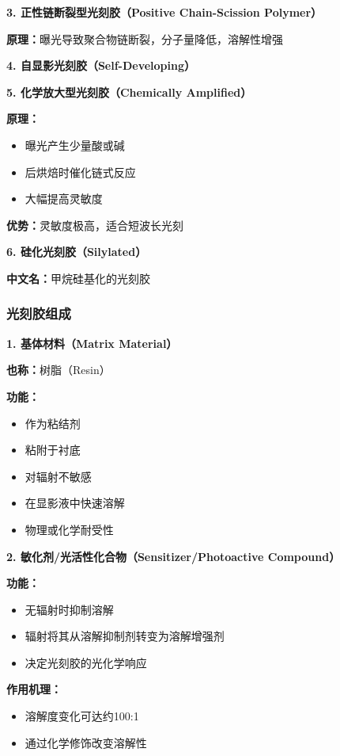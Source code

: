 \documentclass[UTF8,12pt,a4paper]{ctexart}
\begin{document}
\textbf{3. 正性链断裂型光刻胶（Positive Chain-Scission Polymer）}

\textbf{原理：}曝光导致聚合物链断裂，分子量降低，溶解性增强

\textbf{4. 自显影光刻胶（Self-Developing）}

\textbf{5. 化学放大型光刻胶（Chemically Amplified）}

\textbf{原理：}
\begin{itemize}
    \item 曝光产生少量酸或碱
    \item 后烘焙时催化链式反应
    \item 大幅提高灵敏度
\end{itemize}

\textbf{优势：}灵敏度极高，适合短波长光刻

\textbf{6. 硅化光刻胶（Silylated）}

\textbf{中文名：}甲烷硅基化的光刻胶

\subsubsection{光刻胶组成}

\textbf{1. 基体材料（Matrix Material）}

\textbf{也称：}树脂（Resin）

\textbf{功能：}
\begin{itemize}
    \item 作为粘结剂
    \item 粘附于衬底
    \item 对辐射不敏感
    \item 在显影液中快速溶解
    \item 物理或化学耐受性
\end{itemize}

\textbf{2. 敏化剂/光活性化合物（Sensitizer/Photoactive Compound）}

\textbf{功能：}
\begin{itemize}
    \item 无辐射时抑制溶解
    \item 辐射将其从溶解抑制剂转变为溶解增强剂
    \item 决定光刻胶的光化学响应
\end{itemize}

\textbf{作用机理：}
\begin{itemize}
    \item 溶解度变化可达约100:1
    \item 通过化学修饰改变溶解性
\end{itemize}
\end{document}
